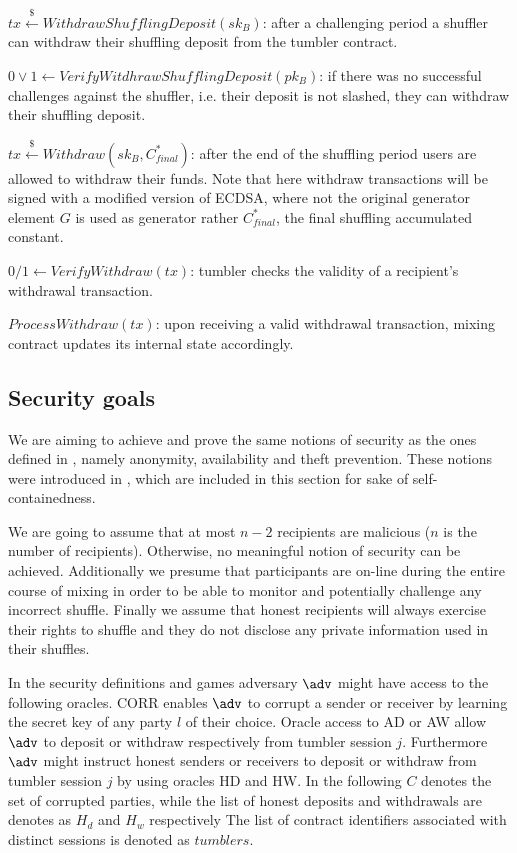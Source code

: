\documentclass[conference, compsoc]{IEEEtran}
\theoremstyle{definition}
\begin{document}
$tx\stackrel{\$}{\leftarrow}WithdrawShufflingDeposit(sk_B)$: after a challenging period a shuffler can withdraw their shuffling deposit from the tumbler contract.

$0\lor1\leftarrow VerifyWitdhrawShufflingDeposit(pk_B)$: if there was no successful challenges against the shuffler, i.e. their deposit is not slashed, they can withdraw their shuffling deposit. 

$tx\stackrel{\$}{\leftarrow}Withdraw(sk_B, C^{*}_{final})$: after the end of the shuffling period users are allowed to withdraw their funds. Note that here withdraw transactions will be signed with a modified version of ECDSA, where not the original generator element $G$ is used as generator rather $C^{*}_{final}$, the final shuffling accumulated constant.

$0/1\leftarrow VerifyWithdraw(tx)$: tumbler checks the validity of a recipient's withdrawal transaction.

$ProcessWithdraw(tx)$: upon receiving a valid withdrawal transaction, mixing contract updates its internal state accordingly.

\subsection{Security goals} \label{securitygoals}
We are aiming to achieve and prove the same notions of security as the ones defined in \cite{meiklejohn2018mobius}, namely anonymity, availability and theft prevention. These notions were introduced in \cite{meiklejohn2018mobius}, which are included in this section for sake of self-containedness.

We are going to assume that at most $n-2$ recipients are malicious ($n$ is the number of recipients). Otherwise, no meaningful notion of security can be achieved. Additionally we presume that participants are on-line during the entire course of mixing in order to be able to monitor and potentially challenge any incorrect shuffle. Finally we assume that honest recipients will always exercise their rights to shuffle and they do not disclose any private information used in their shuffles.

In the security definitions and games adversary $\adv$ might have access to the following oracles. CORR enables $\adv$ to corrupt a sender or receiver by learning the secret key of any party $l$ of their choice. Oracle access to AD or AW allow $\adv$ to deposit or withdraw respectively from tumbler session $j$. Furthermore $\adv$ might instruct honest senders or receivers to deposit or withdraw from tumbler session $j$ by using oracles HD and HW. In the following $C$ denotes the set of corrupted parties, while the list of honest deposits and withdrawals are denotes as $H_{d}$ and $H_{w}$ respectively The list of contract identifiers associated with distinct sessions is denoted as $tumblers$.
\end{document}
